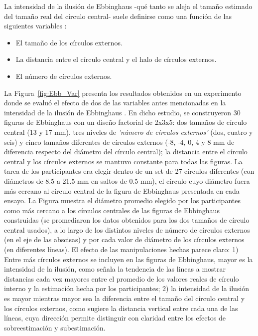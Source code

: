 La intensidad de la ilusión de Ebbinghaus -qué tanto se aleja el tamaño estimado del tamaño real del círculo central- suele definirse como una función de las siguientes variables \parencite{Massaro1971, Girgus1972, Roberts2005}: 

\begin{itemize}
\item El tamaño de los círculos externos.
\item La distancia entre el círculo central y el halo de círculos externos.
\item El número de círculos externos.
\end{itemize}

La Figura~\ref{fig:Ebb_Var} presenta los resultados obtenidos en un experimento donde se evaluó el efecto de dos de las variables antes mencionadas en la intensidad de la ilusión de Ebbinghaus \parencite{Massaro1971}. En dicho estudio, se construyeron 30 figuras de Ebbinghaus con un diseño factorial de 2x3x5: dos tamaños de círculo central (13 y 17 mm), tres niveles de \textit{'número de círculos externos'} (dos, cuatro y seis) y cinco tamaños diferentes de círculos externos (-8, -4, 0, 4 y 8 mm de diferencia respecto del diámetro del círculo central); la distancia entre el círculo central y los círculos externos se mantuvo constante para todas las figuras. La tarea de los participantes era elegir dentro de un set de 27 círculos diferentes (con diámetros de 8.5 a 21.5 mm en saltos de 0.5 mm), el círculo cuyo diámetro fuera más cercano al círculo central de la figura de Ebbinghaus presentada en cada ensayo. La Figura muestra el diámetro promedio elegido por los participantes como más cercano a los círculos centrales de las figuras de Ebbinghaus construidas (se promediaron los datos obtenidos para los dos tamaños de círculo central usados), a lo largo de los distintos niveles de número de círculos externos (en el eje de las abscisas) y por cada valor de diámetro de los círculos externos (en diferentes líneas). El efecto de las manipulaciones hechas parece claro: 1) Entre más círculos externos se incluyen en las figuras de Ebbinghaus, mayor es la intensidad de la ilusión, como señala la tendencia de las lineas a mostrar distancias cada vez mayores entre el promedio de los valores reales de círculo interno y la estimación hecha por los participantes; 2) la intensidad de la ilusión es mayor mientras mayor sea la diferencia entre el tamaño del círculo central y los círculos externos, como sugiere la distancia vertical entre cada una de las líneas, cuya dirección permite distinguir con claridad entre los efectos de sobreestimación y subestimación.\\

